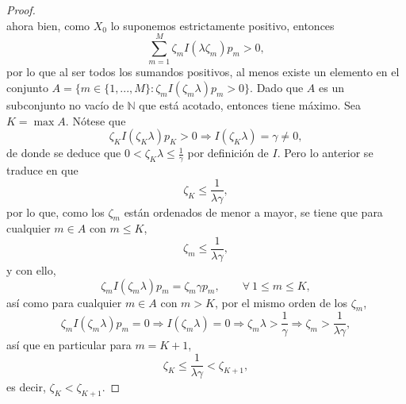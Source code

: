 \documentclass[letterpaper]{article}
\newcommand{\N}{\mathbb N}
\newcommand{\ent}{\Longrightarrow}
\newcommand{\1}{\mathds{1}}
\theoremstyle{definition}
\theoremstyle{definition}
\theoremstyle{definition}
\theoremstyle{definition}
\theoremstyle{definition}
\begin{document}
\begin{enumerate}
\begin{enumerate}
\begin{proof}
\[      \] 
      ahora bien, como $X_0$ lo suponemos estrictamente positivo, entonces 
      \[
        \sum_{m=1}^{M}\zeta_mI(\lambda\zeta_m)p_m>0,
      \]
      por lo que al ser todos los sumandos positivos, al menos existe un elemento en el conjunto $A=\{m\in \{1,...,M\} : \zeta_mI(\zeta_m\lambda)p_m>0\}$.
      Dado que $A$ es un subconjunto no vacío de $\N$ que está acotado, entonces tiene máximo. Sea $K=\max A$. Nótese que 
      \[
      \zeta_KI(\zeta_K\lambda)p_K>0 \ent I(\zeta_K\lambda)=\gamma\neq 0,
      \]
      de donde se deduce que $0<\zeta_K\lambda\leq \frac{1}{\gamma}$ por definición de $I$. Pero lo anterior se traduce en que
      \[    
        \zeta_K\leq \frac{1}{\lambda \gamma},
        \]  
        por lo que, como los $\zeta_m$ están ordenados de menor a mayor, se tiene que
        para cualquier $m\in A$ con $m\leq K$, 
        \[
        \zeta_m\leq \frac{1}{\lambda \gamma},    
        \]
        y con ello, 
        \[
        \zeta_mI(\zeta_m\lambda)p_m=\zeta_m\gamma p_m, \qquad \forall \ 1\leq m \leq K,    
        \]
        así como para cualquier $m\in A$ con $m>K$, por el mismo orden de los $\zeta_m$, 
        $$\zeta_mI(\zeta_m\lambda)p_m=0 \ent I(\zeta_m\lambda)=0 \ent \zeta_m\lambda>\frac{1}{\gamma} \ent \zeta_m>\frac{1}{\lambda \gamma},$$
        así que en particular para $m=K+1$,
        \[
        \zeta_K\leq\frac{1}{\lambda\gamma}<\zeta_{K+1},    
        \]
        es decir, $\zeta_K<\zeta_{K+1}$.


\end{proof}
\end{enumerate}
\end{enumerate}
\end{document}

